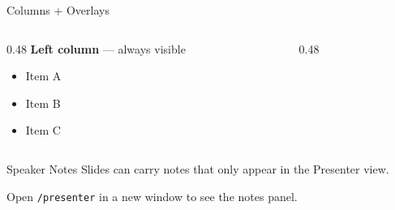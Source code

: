 \documentclass[aspectratio=169]{beamer}
\begin{document}
\begin{frame}{Columns + Overlays}
  \begin{columns}
    \begin{column}{0.48\textwidth}
      \textbf{Left column} — always visible

      \begin{itemize}
        \item<1-> Item A
        \item<2-> Item B
        \item<3-> Item C
      \end{itemize}
    \end{column}
    \begin{column}{0.48\textwidth}
    \end{column}
  \end{columns}
\end{frame}


\begin{frame}{Speaker Notes}
  Slides can carry notes that only appear in the Presenter view.


  \bigskip

  Open \texttt{/presenter} in a new window to see the notes panel.
\end{frame}
\end{document}
